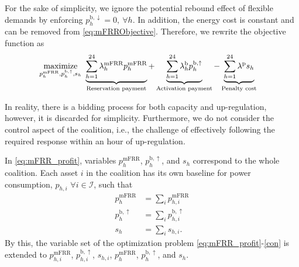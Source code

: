 \documentclass[conference]{IEEEtran}
\begin{document}

For the sake of simplicity, we ignore the potential rebound effect of flexible demands by enforcing $p_{h}^{\text{b}, \downarrow} = 0, \ \forall{h}$. In addition, the energy cost is constant and can be removed from \eqref{eq:mFRRObjective}. Therefore, we rewrite the objective function as
%
\begin{align}\label{eq:mFRR_profit}
     & \underset{p^{\text{mFRR}}_{h}, p^{\text{b},\uparrow}_{h}, s_{h}}{\rm{maximize}} \ \underbrace{\sum_{h=1}^{24}\lambda_{h}^{\text{mFRR}} p^{\text{mFRR}}_{h}}_{\textrm{Reservation payment}} + \underbrace{\sum_{h=1}^{24}  \lambda_{h}^{\text{b}} p^{\text{b},\uparrow}_{h}}_{\textrm{Activation payment}} - \underbrace{ \sum_{h=1}^{24}  \lambda^{\text{p}}s_{h}}_{\textrm{Penalty cost}}
\end{align}


In reality, there is a bidding process for both capacity and up-regulation, however, it is discarded for simplicity. Furthermore, we do not consider the control aspect of the coalition, i.e., the challenge of effectively following the required response within an hour of up-regulation.


In \eqref{eq:mFRR_profit}, variables $p^{\text{mFRR}}_{h}$, $p^{\text{b},\uparrow}_{h}$, and $s_{h}$ correspond to the whole coalition. Each asset $i$ in the coalition has its own baseline for power consumption, $p_{h, i}$ $\forall{i} \in \mathcal{I}$, such that
%
\begin{subequations} \label{con}
    \begin{align}
        p^{\text{mFRR}}_{h}        & = \sum_{i} p^{\text{mFRR}}_{h, i}       \\
        p^{\text{b}, \uparrow}_{h} & = \sum_{i}p^{\text{b}, \uparrow}_{h, i} \\
        s_{h}                      & = \sum_{i} s_{h, i}.
    \end{align}
\end{subequations}
%
By this, the variable set of the optimization problem \eqref{eq:mFRR_profit}-\eqref{con} is extended to $p^{\text{mFRR}}_{h, i}$, $p^{\text{b}, \uparrow}_{h, i}$, $s_{h, i}$, $p^{\text{mFRR}}_{h}$, $p^{\text{b},\uparrow}_{h}$, and $s_{h}$.
\end{document}
